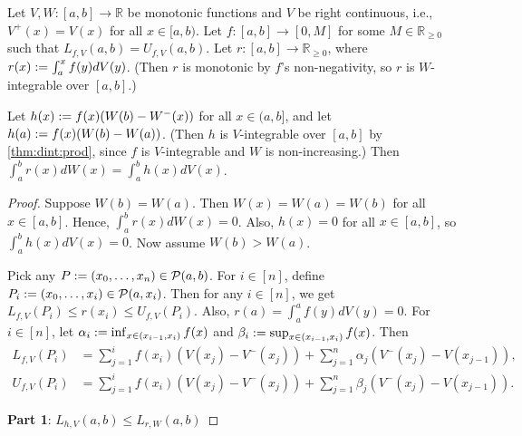 \documentclass[a4paper,12pt,fleqn]{article}
\begin{document}
\begin{lemma}
Let $V, W: [a, b] \to \mathbb{R}$ be monotonic functions
and $V$ be right continuous, i.e., $V^+(x) = V(x)$ for all $x \in [a, b)$.
Let $f: [a, b] \to [0, M]$ for some $M \in \mathbb{R}_{\ge 0}$
such that $L_{f,V}(a, b) = U_{f,V}(a, b)$.
Let $r: [a, b] \to \mathbb{R}_{\ge 0}$, where
$r(x) := \int_a^x f(y)dV(y)$.
(Then $r$ is monotonic by $f$'s non-negativity,
so $r$ is $W$-integrable over $[a, b]$.)

Let $h(x) := f(x)(W(b)-W^-(x))$ for all $x \in (a, b]$,
and let $h(a) := f(x)(W(b)-W(a))$.
(Then $h$ is $V$-integrable over $[a, b]$ by \cref{thm:dint:prod},
since $f$ is $V$-integrable and $W$ is non-increasing.)
Then $\int_a^b r(x)dW(x) = \int_a^b h(x)dV(x)$.
\end{lemma}
\begin{proof}
Suppose $W(b) = W(a)$. Then $W(x) = W(a) = W(b)$ for all $x \in [a, b]$.
Hence, $\int_a^b r(x)dW(x) = 0$. Also, $h(x) = 0$ for all $x \in [a, b]$,
so $\int_a^b h(x)dV(x) = 0$. Now assume $W(b) > W(a)$.

Pick any $P := (x_0, \ldots, x_n) \in \mathcal{P}(a, b)$.
For $i \in [n]$, define $P_i := (x_0, \ldots, x_i) \in \mathcal{P}(a, x_i)$.
Then for any $i \in [n]$, we get $L_{f,V}(P_i) \le r(x_i) \le U_{f,V}(P_i)$.
Also, $r(a) = \int_a^a f(y)dV(y) = 0$.
For $i \in [n]$, let $\alpha_i := \inf_{x \in (x_{i-1}, x_i)} f(x)$
and $\beta_i := \sup_{x \in (x_{i-1}, x_i)} f(x)$. Then
\begin{align*}
L_{f,V}(P_i) &= \sum_{j=1}^i f(x_i)(V(x_j)-V^-(x_j)) + \sum_{j=1}^n \alpha_j(V^-(x_j)-V(x_{j-1})),
\\ U_{f,V}(P_i) &= \sum_{j=1}^i f(x_i)(V(x_j)-V^-(x_j)) + \sum_{j=1}^n \beta_j(V^-(x_j)-V(x_{j-1})).
\end{align*}

\textbf{Part 1}: $L_{h,V}(a, b) \le L_{r,W}(a, b)$


\end{proof}
\end{document}
